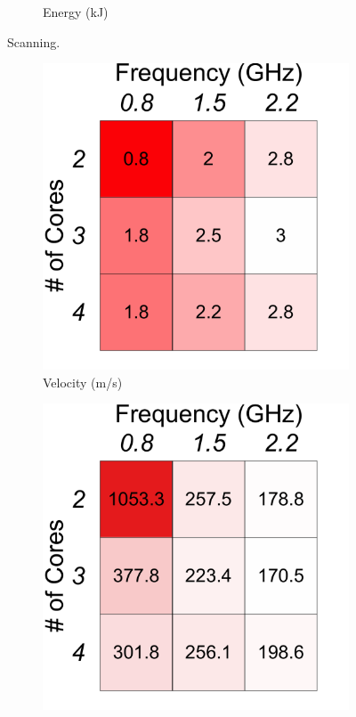 {\begin{figure}[t!]
\begin{subfigure}[t!]{.3\columnwidth}
    \caption{Energy (kJ)}
    \label{fig:benchmarks:OPA:scanning:energy}
    \end{subfigure}
    \caption{Scanning.}
    \label{fig:benchmarks:OPA:scanning}
    \end{figure}%
   \begin{figure}[t!]
    \centering
    \begin{subfigure}[t!]{.3\columnwidth}
    \centering
    \includegraphics[width=\columnwidth]{figs/pd_velocity_operating_point}
    \caption{Velocity (m/s)}
     \label{fig:benchmarks:OPA:pd:velocity}
    \end{subfigure}
    \begin{subfigure}[t!]{.3\columnwidth}
    \centering
    \includegraphics[width=\columnwidth]{figs/pd_flight_time_operating_point}

\end{subfigure}
\end{figure}}
